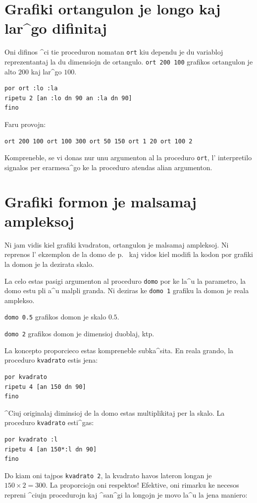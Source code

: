\section{Grafiki ortangulon je longo kaj lar^go difinitaj}
\noindent Oni difinos ^ci tie proceduron nomatan \texttt{ort} kiu
dependu je du variabloj reprezentantaj la du dimensiojn de ortangulo.
\texttt{ort 200 100} grafikos ortangulon je alto $200$ kaj lar^go $100$.
\begin{verbatim}
por ort :lo :la
ripetu 2 [an :lo dn 90 an :la dn 90]
fino
\end{verbatim} 
Faru provojn:
\begin{verbatim}
ort 200 100 ort 100 300 ort 50 150 ort 1 20 ort 100 2 
\end{verbatim}
Kompreneble, se vi donas nur unu argumenton al la proceduro
\texttt{ort}, l' interpretilo signalos per erarmesa^go ke la proceduro
atendas alian argumenton.
\section{Grafiki formon je malsamaj ampleksoj}
\noindent
Ni jam vidis kiel grafiki kvadraton, ortangulon je malsamaj ampleksoj.
Ni reprenos l' ekzemplon de la domo de p.~\pageref{maison} kaj vidos
kiel modifi la kodon por grafiki la domon je la dezirata skalo.

La celo estas pasigi argumenton al proceduro \texttt{domo} por ke la^u
la parametro, la domo estu pli a^u malpli granda.  Ni deziras ke 
\texttt{domo 1} grafiku la domon je reala amplekso.

\texttt{domo 0.5} grafikos domon je skalo $0.5$.

\texttt{domo 2} grafikos domon je dimensioj duoblaj, ktp.

La koncepto proporcieco estas kompreneble subka^sita.  En reala
grando, la proceduro \texttt{kvadrato} estis jena:
\begin{verbatim}
por kvadrato
ripetu 4 [an 150 dn 90]
fino
\end{verbatim}
^Ciuj originalaj diminsioj de la domo estas multiplikitaj per la
skalo.  La proceduro \texttt{kvadrato} esti^gas:
\begin{verbatim}
por kvadrato :l
ripetu 4 [an 150*:l dn 90]
fino
\end{verbatim}
Do kiam oni tajpos \texttt{kvadrato 2}, la kvadrato havos lateron
longan je $150\times2=300$.  La proporciojn oni respektos!  Efektive,
oni rimarku ke necesos repreni ^ciujn procedurojn kaj ^san^gi la
longojn je movo la^u la jena maniero:

